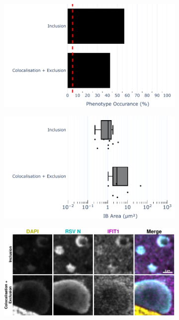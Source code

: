\begin{figure}
    \begin{subfigure}{0.5\textwidth}
        \caption{}
        \includegraphics[width=1\linewidth]{09. Chapter 4/Figs/03. pIB/01. IFIT1/07. bar_i1_vero_bnbp.pdf} 
    \end{subfigure}
    \begin{subfigure}{0.5\textwidth}
        \caption{}
        \includegraphics[width=1\linewidth]{09. Chapter 4/Figs/03. pIB/01. IFIT1/08. box_i1_vero_bnbp.pdf}
    \end{subfigure}
    \begin{subfigure}{1\textwidth}
        \centering
        \caption{}
        \includegraphics[width=1\linewidth]{09. Chapter 4/Figs/03. pIB/01. IFIT1/09. i1-vero-bnbp.pdf}

\end{subfigure}
\end{figure}
